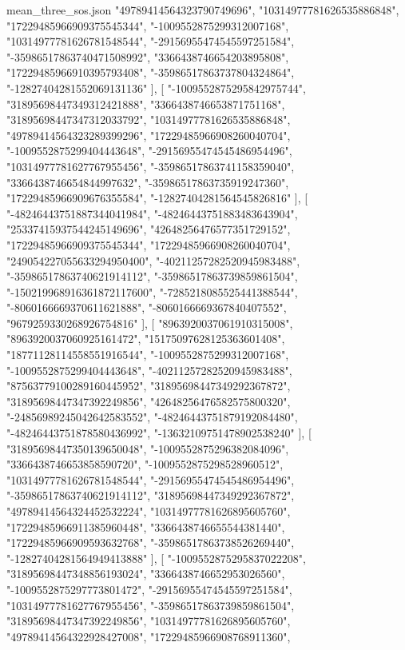 \begin{filecontents*}[overwrite]{mean_three_sos.json}
    "49789414564323790749696",
    "10314977781626535886848",
    "17229485966909375545344",
    "-1009552875299312007168",
    "10314977781626781548544",
    "-29156955474545597251584",
    "-35986517863740471508992",
    "3366438746654203895808",
    "17229485966910395793408",
    "-35986517863737804324864",
    "-12827404281552069131136"
   ],
   [
    "-1009552875295842975744",
    "31895698447349312421888",
    "3366438746653871751168",
    "31895698447347312033792",
    "10314977781626535886848",
    "49789414564323289399296",
    "17229485966908260040704",
    "-1009552875299404443648",
    "-29156955474545486954496",
    "10314977781627767955456",
    "-35986517863741158359040",
    "3366438746654844997632",
    "-35986517863735919247360",
    "17229485966909676355584",
    "-12827404281564545826816"
   ],
   [
    "-48246443751887344041984",
    "-48246443751883483643904",
    "25337415937544245149696",
    "42648256476577351729152",
    "17229485966909375545344",
    "17229485966908260040704",
    "249054227055633294950400",
    "-40211257282520945983488",
    "-35986517863740621914112",
    "-35986517863739859861504",
    "-150219968916361872117600",
    "-7285218085525441388544",
    "-8060166669370611621888",
    "-8060166669367840407552",
    "9679259330268926754816"
   ],
   [
    "8963920037061910315008",
    "8963920037060925161472",
    "15175097628125363601408",
    "18771128114558551916544",
    "-1009552875299312007168",
    "-1009552875299404443648",
    "-40211257282520945983488",
    "87563779100289160445952",
    "31895698447349292367872",
    "31895698447347392249856",
    "42648256476582575800320",
    "-24856989245042642583552",
    "-48246443751879192084480",
    "-48246443751878580436992",
    "-13632109751478902538240"
   ],
   [
    "31895698447350139650048",
    "-1009552875296382084096",
    "3366438746653858590720",
    "-1009552875298528960512",
    "10314977781626781548544",
    "-29156955474545486954496",
    "-35986517863740621914112",
    "31895698447349292367872",
    "49789414564324452532224",
    "10314977781626895605760",
    "17229485966911385960448",
    "3366438746655544381440",
    "17229485966909593632768",
    "-35986517863738526269440",
    "-12827404281564949413888"
   ],
   [
    "-1009552875295837022208",
    "31895698447348856193024",
    "3366438746652953026560",
    "-1009552875297773801472",
    "-29156955474545597251584",
    "10314977781627767955456",
    "-35986517863739859861504",
    "31895698447347392249856",
    "10314977781626895605760",
    "49789414564322928427008",
    "17229485966908768911360",

\end{filecontents*}
